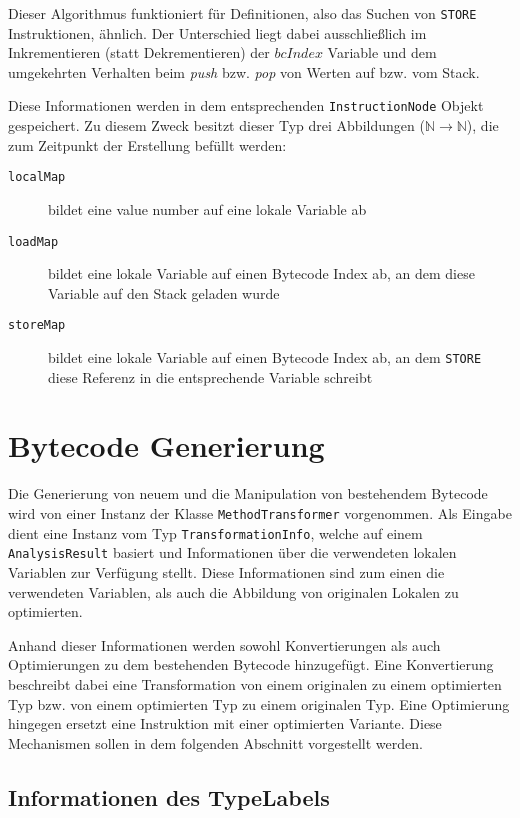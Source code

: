Dieser Algorithmus funktioniert für Definitionen, also das Suchen von \texttt{STORE}
Instruktionen, ähnlich. Der Unterschied liegt dabei ausschließlich im Inkrementieren 
(statt Dekrementieren) der $bcIndex$ Variable und dem umgekehrten Verhalten beim 
\textit{push} bzw. \textit{pop} von Werten auf bzw. vom Stack.

Diese Informationen werden in dem entsprechenden \texttt{InstructionNode} Objekt
gespeichert. Zu diesem Zweck besitzt dieser Typ drei Abbildungen ($\mathbb{N} \rightarrow 
\mathbb{N}$), die zum Zeitpunkt der Erstellung befüllt werden:

\begin{description}
	\item [\texttt{localMap}] bildet eine value number auf eine lokale Variable ab
	\item [\texttt{loadMap}] bildet eine lokale Variable auf einen Bytecode Index ab, an 
	dem diese Variable auf den Stack geladen wurde
	\item [\texttt{storeMap}] bildet eine lokale Variable auf einen Bytecode Index ab, an
	dem \texttt{STORE} diese Referenz in die entsprechende Variable schreibt
\end{description} 

\section{Bytecode Generierung}

Die Generierung von neuem und die Manipulation von bestehendem Bytecode wird von einer Instanz der
Klasse \texttt{MethodTransformer} vorgenommen. Als Eingabe dient eine Instanz vom Typ 
\texttt{TransformationInfo}, welche auf einem \texttt{AnalysisResult} basiert und 
Informationen über die verwendeten lokalen Variablen zur Verfügung stellt. Diese Informationen
sind zum einen die verwendeten Variablen, als auch die Abbildung von originalen Lokalen
zu optimierten.

Anhand dieser Informationen werden sowohl Konvertierungen als auch Optimierungen zu dem bestehenden
Bytecode hinzugefügt. Eine Konvertierung beschreibt dabei eine Transformation von einem originalen 
zu einem optimierten Typ bzw. von einem optimierten Typ zu einem originalen Typ. Eine Optimierung 
hingegen ersetzt eine Instruktion mit einer optimierten Variante. Diese Mechanismen sollen in dem 
folgenden Abschnitt vorgestellt werden.

\subsection{Informationen des TypeLabels}
\label{ssec:infoLabel}

